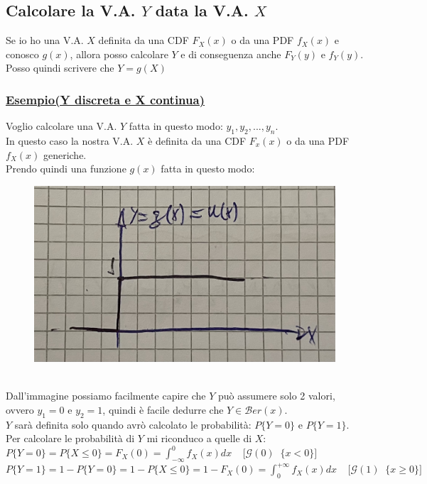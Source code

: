 \documentclass{article}
\begin{document}
\subsection{Calcolare la V.A. $Y$ data la V.A. $X$}
Se io ho una V.A. $X$ definita da una CDF $F_X(x)$ o da una PDF $f_X(x)$ e conosco $g(x)$, allora posso calcolare $Y$ e di conseguenza anche $F_Y(y)$ e $f_Y(y)$. \\
Posso quindi scrivere che $Y=g(X)$ 
\subsubsection{\underline{Esempio(Y discreta e X continua)}}
Voglio calcolare una V.A. $Y$ fatta in questo modo: $y_1,y_2,...,y_n.$ \\
In questo caso la nostra V.A. $X$ è definita da una CDF $F_x(x)$ o da una PDF
$f_X(x)$ generiche. \\
Prendo quindi una funzione $g(x)$ fatta in questo modo:
\begin{figure}[ht]
\centering
\includegraphics[scale=0.12]{images/41.EsTrasf1.jpeg}
\end{figure} ~\\
Dall'immagine possiamo facilmente capire che $Y$ può assumere solo 2 valori,
ovvero $y_1=0$ e $y_2=1$, quindi è facile dedurre che $Y\in\mathcal{B}er(x)$. \\
$Y$ sarà definita solo quando avrò calcolato le probabilità: $P \big\{Y = 0\big\}$ e $P \big\{Y = 1\big\}$. \\
Per calcolare le probabilità di $Y$ mi riconduco a quelle di $X$: \\
$P \big\{Y = 0\big\} = P \big\{X \leq 0\big\} = F_X(0) = \int_{- \infty}^{0} f_X(x) dx \;\;\;\; \big[\mathcal{G}(0) \;\; \big\{x < 0\big\}\big]$ \\
$P \big\{Y = 1\big\} = 1 - P \big\{Y = 0\big\} =  1 - P \big\{X \leq 0\big\} = 1-F_X(0) = \int_{0}^{+ \infty} f_X(x) dx \;\;\;\; \big[\mathcal{G}(1) \;\; \big\{x \geq 0\big\}\big]$ \\
\end{document}

